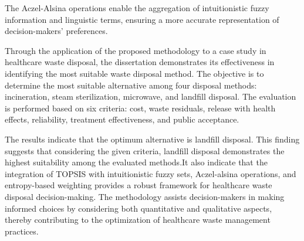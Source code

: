 \hspace{1.5cm}The Aczel-Alsina operations enable the aggregation of intuitionistic fuzzy information and linguistic terms, ensuring a more accurate representation of decision-makers' preferences.

\hspace{1.5cm}Through the application of the proposed methodology to a case study in healthcare waste disposal, the dissertation demonstrates its effectiveness in identifying the most suitable waste disposal method. The objective is to determine the most suitable alternative among four disposal methods: incineration, steam sterilization, microwave, and landfill disposal. The evaluation is performed based on six criteria: cost, waste residuals, release with health effects, reliability, treatment effectiveness, and public acceptance.


\hspace{1.5cm}The results indicate that the optimum alternative is landfill disposal. This finding suggests that considering the given criteria, landfill disposal demonstrates the highest suitability among the evaluated methods.It also indicate that the integration of TOPSIS with intuitionistic fuzzy sets, Aczel-alsina operations, and entropy-based weighting provides a robust framework for healthcare waste disposal decision-making. The methodology assists decision-makers in making informed choices by considering both quantitative and qualitative aspects, thereby contributing to the optimization of healthcare waste management practices.

